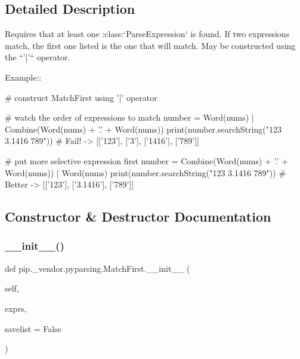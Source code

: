 \subsection{Detailed Description}
\begin{DoxyVerb}Requires that at least one :class:`ParseExpression` is found. If
two expressions match, the first one listed is the one that will
match. May be constructed using the ``'|'`` operator.

Example::

    # construct MatchFirst using '|' operator

    # watch the order of expressions to match
    number = Word(nums) | Combine(Word(nums) + '.' + Word(nums))
    print(number.searchString("123 3.1416 789")) #  Fail! -> [['123'], ['3'], ['1416'], ['789']]

    # put more selective expression first
    number = Combine(Word(nums) + '.' + Word(nums)) | Word(nums)
    print(number.searchString("123 3.1416 789")) #  Better -> [['123'], ['3.1416'], ['789']]
\end{DoxyVerb}
 

\subsection{Constructor \& Destructor Documentation}
\mbox{\label{classpip_1_1__vendor_1_1pyparsing_1_1MatchFirst_ac46ce5147cd67dce3ee086bab65aaad8}} 
\subsubsection{\texorpdfstring{\+\_\+\+\_\+init\+\_\+\+\_\+()}{\_\_init\_\_()}}
{\footnotesize\ttfamily def pip.\+\_\+vendor.\+pyparsing.\+Match\+First.\+\_\+\+\_\+init\+\_\+\+\_\+ (\begin{DoxyParamCaption}\item[{}]{self,  }\item[{}]{exprs,  }\item[{}]{savelist = {\ttfamily False} }\end{DoxyParamCaption})}



